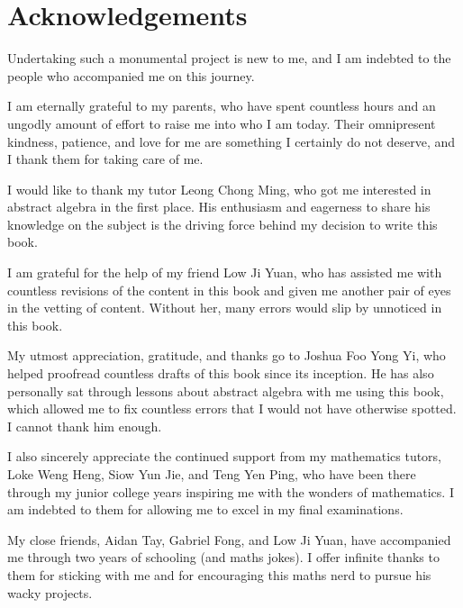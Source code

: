 \vspace*{\fill}

\begin{center}
    \fontsize{8pt}{8pt}\selectfont
\end{center}

\newpage

\createtoc

\chapter{Acknowledgements}
Undertaking such a monumental project is new to me, and I am indebted to the people who accompanied me on this journey.

I am eternally grateful to my parents, who have spent countless hours and an ungodly amount of effort to raise me into who I am today. Their omnipresent kindness, patience, and love for me are something I certainly do not deserve, and I thank them for taking care of me.

I would like to thank my tutor Leong Chong Ming, who got me interested in abstract algebra in the first place. His enthusiasm and eagerness to share his knowledge on the subject is the driving force behind my decision to write this book.

I am grateful for the help of my friend Low Ji Yuan, who has assisted me with countless revisions of the content in this book and given me another pair of eyes in the vetting of content. Without her, many errors would slip by unnoticed in this book.

My utmost appreciation, gratitude, and thanks go to Joshua Foo Yong Yi, who helped proofread countless drafts of this book since its inception. He has also personally sat through lessons about abstract algebra with me using this book, which allowed me to fix countless errors that I would not have otherwise spotted. I cannot thank him enough.

I also sincerely appreciate the continued support from my mathematics tutors, Loke Weng Heng, Siow Yun Jie, and Teng Yen Ping, who have been there through my junior college years inspiring me with the wonders of mathematics. I am indebted to them for allowing me to excel in my final examinations.

My close friends, Aidan Tay, Gabriel Fong, and Low Ji Yuan, have accompanied me through two years of schooling (and maths jokes). I offer infinite thanks to them for sticking with me and for encouraging this maths nerd to pursue his wacky projects.

